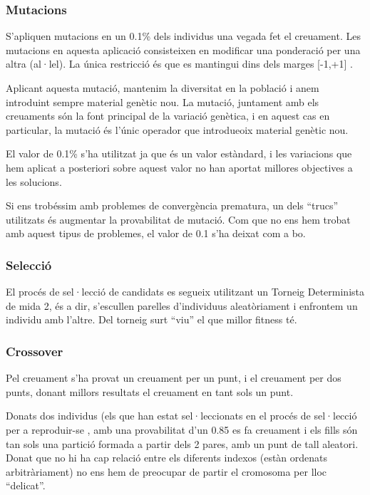 \documentclass[titlepage,a4paper,12pt]{book}
\begin{document}
\subsubsection{Mutacions} %
\label{ssub:Mutacions}

S'apliquen mutacions en un 0.1\% dels individus una vegada fet el creuament.
Les mutacions en aquesta aplicació consisteixen en modificar una ponderació per
una altra (al·lel).  La única restricció és que es mantingui dins dels marges
[-1,+1] .  

Aplicant aquesta mutació, mantenim la diversitat en la població i anem
introduint sempre material genètic nou.  La mutació, juntament amb els
creuaments són la font principal de la variació genètica, i en aquest cas en
particular, la mutació és l'únic operador que introdueoix material genètic nou.

El valor de 0.1\% s'ha utilitzat ja que és un valor estàndard, i les variacions
que hem aplicat a posteriori sobre aquest valor no han aportat millores
objectives a les solucions.

Si ens trobéssim amb problemes de convergència prematura, un dels ``trucs''
utilitzats és augmentar la provabilitat de mutació.  Com que no ens hem trobat
amb aquest tipus de problemes, el valor de 0.1 s'ha deixat com a bo.

\subsubsection{Selecció} %
\label{ssub:Seleccio}
El procés de sel·lecció de candidats es segueix utilitzant un Torneig
Determinista de mida 2, és a dir, s'escullen parelles d'individuus
aleatòriament i enfrontem un individu amb l'altre. Del torneig surt ``viu'' el
que millor fitness té.

\subsubsection{Crossover} %
\label{ssub:Crossover}

Pel creuament s'ha provat un creuament per un punt, i el creuament per dos
punts, donant millors resultats el creuament en tant sols un punt.  

Donats dos individus (els que han estat sel·leccionats en el procés de
sel·lecció per a reproduir-se , amb una provabilitat d'un 0.85 es fa creuament i
els fills són tan sols una partició formada a partir dels 2 pares, amb un punt
de tall aleatori.  Donat que no hi ha cap relació entre els diferents indexos
(estàn ordenats arbitràriament) no ens hem de preocupar de partir el cromosoma
per lloc ``delicat''. 
\end{document}
